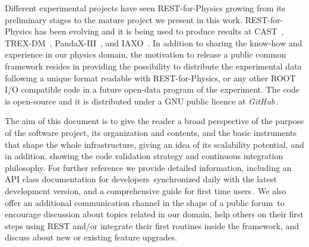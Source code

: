 Different experimental projects have seen REST-for-Physics growing from its preliminary stages to the mature project we present in this work. REST-for-Physics has been evolving and it is being used to produce results at CAST~\cite{Anastassopoulos:2017ftl}, TREX-DM~\cite{trexdm_bckmodel}, PandaX-III~\cite{pandaxiii_cdr,Lin:2018mpd,Galan:2019ake}, and IAXO~\cite{Armengaud:2019uso}. In addition to sharing the know-how and experience in our physics domain, the motivation to release a public common framework resides in providing the possibility to distribute the experimental data following a unique format readable with REST-for-Physics, or any other ROOT I/O compatible code in a future open-data program of the experiment. The code is open-source and it is distributed under a GNU public licence at \emph{GitHub}\,\cite{REST_Git}.

The aim of this document is to give the reader a broad perspective of the purpose of the software project, its organization and contents, and the basic instruments that shape the whole infrastructure, giving an idea of its scalability potential, and in addition, showing the code validation strategy and continuous integration philosophy. For further reference we provide detailed information, including an API class documentation for developers\,\cite{REST_API}  synchronized daily with the latest development version, and a comprehensive guide for first time users\,\cite{REST_user_guide}. We also offer an additional communication channel in the shape of a public forum\,\cite{REST_forum} to encourage discussion about topics related in our domain, help others on their first steps using REST and/or integrate their first routines inside the framework, and discuss about new or existing feature upgrades.